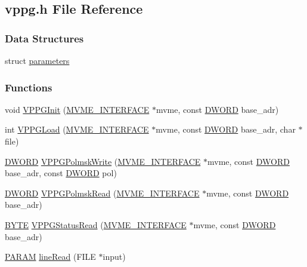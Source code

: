 \subsection{vppg.h File Reference}
\label{vppg_8h}
\subsubsection*{Data Structures}
\begin{DoxyCompactItemize}
\item 
struct \hyperlink{structparameters}{parameters}
\end{DoxyCompactItemize}
\subsubsection*{Functions}
\begin{DoxyCompactItemize}
\item 
void \hyperlink{vppg_8h_a379092e6b2de168766f8773009f75f2b}{VPPGInit} (\hyperlink{structMVME__INTERFACE}{MVME\_\-INTERFACE} $\ast$mvme, const \hyperlink{vt2_8h_a798af1e30bc65f319c1a246cecf59e39}{DWORD} base\_\-adr)
\item 
int \hyperlink{vppg_8h_acd643aa3649bb10efabfdc28963ac52b}{VPPGLoad} (\hyperlink{structMVME__INTERFACE}{MVME\_\-INTERFACE} $\ast$mvme, const \hyperlink{vt2_8h_a798af1e30bc65f319c1a246cecf59e39}{DWORD} base\_\-adr, char $\ast$file)
\item 
\hyperlink{vt2_8h_a798af1e30bc65f319c1a246cecf59e39}{DWORD} \hyperlink{vppg_8h_a10ec4e8a15c99cffbb75a1bba6d72c1d}{VPPGPolmskWrite} (\hyperlink{structMVME__INTERFACE}{MVME\_\-INTERFACE} $\ast$mvme, const \hyperlink{vt2_8h_a798af1e30bc65f319c1a246cecf59e39}{DWORD} base\_\-adr, const \hyperlink{vt2_8h_a798af1e30bc65f319c1a246cecf59e39}{DWORD} pol)
\item 
\hyperlink{vt2_8h_a798af1e30bc65f319c1a246cecf59e39}{DWORD} \hyperlink{vppg_8h_afc374ec00602443b45c71d28043d7631}{VPPGPolmskRead} (\hyperlink{structMVME__INTERFACE}{MVME\_\-INTERFACE} $\ast$mvme, const \hyperlink{vt2_8h_a798af1e30bc65f319c1a246cecf59e39}{DWORD} base\_\-adr)
\item 
\hyperlink{vt2_8h_a4ae1dab0fb4b072a66584546209e7d58}{BYTE} \hyperlink{vppg_8h_a23fc7a80ad391f80fc10a97417519980}{VPPGStatusRead} (\hyperlink{structMVME__INTERFACE}{MVME\_\-INTERFACE} $\ast$mvme, const \hyperlink{vt2_8h_a798af1e30bc65f319c1a246cecf59e39}{DWORD} base\_\-adr)
\item 
\hyperlink{structparameters}{PARAM} \hyperlink{vppg_8h_a65d359ba2af747d08164cc1180b3f1de}{lineRead} (FILE $\ast$input)

\end{DoxyCompactItemize}
